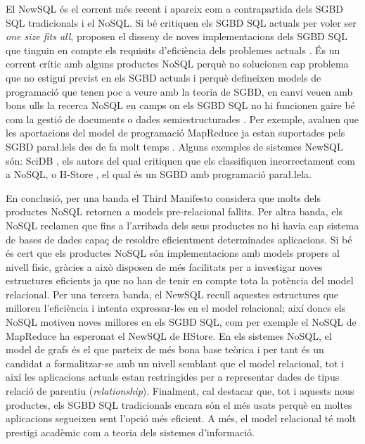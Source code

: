 El NewSQL és el corrent més recent i apareix com a contrapartida dels
\gls{SGBD} \gls{SQL} tradicionals i el NoSQL. Si bé critiquen els \gls{SGBD} \gls{SQL} actuals
per voler ser \emph{one size fits all}, proposen el disseny de noves
implementacions dels \gls{SGBD} \gls{SQL} que tinguin en compte els requisits
d'eficiència dels problemes
actuals \parencite{stonebraker07,stonebraker10}.  És un corrent crític
amb alguns productes NoSQL perquè no solucionen cap problema que no
estigui previst en els \gls{SGBD} actuals i perquè defineixen models de
programació que tenen poc a veure amb la teoria de \gls{SGBD}, en canvi
veuen amb bons ulls la recerca NoSQL en camps on els \gls{SGBD} \gls{SQL} no hi
funcionen gaire bé com la gestió de documents o dades
semiestructurades \parencite{stonebraker11:nocoug}.  Per exemple,
avaluen que les aportacions del model de programació MapReduce ja
estan suportades pels \gls{SGBD} para\l.lels des de fa molt
temps \parencite{pavlo09:sigmod}.  Alguns exemples de sistemes NewSQL
són: SciDB \parencite{stonebraker09:scidb}, els autors del qual
critiquen que els classifiquen incorrectament com a NoSQL, o
H-Store \parencite{hstore}, el qual és un \gls{SGBD} amb programació
para\l.lela.



En conclusió, per una banda el Third Manifesto considera que molts
dels productes NoSQL retornen a models pre-relacional fallits. Per
altra banda, els NoSQL reclamen que fins a l'arribada dels seus
productes no hi havia cap sistema de bases de dades capaç de resoldre
eficientment determinades aplicacions. Si bé és cert que els productes
NoSQL són implementacions amb models propers al nivell físic, gràcies
a això disposen de més facilitats per a investigar noves estructures
eficients ja que no han de tenir en compte tota la potència del model
relacional. Per una tercera banda, el NewSQL recull aquestes
estructures que milloren l'eficiència i intenta expressar-les en el
model relacional; així doncs els NoSQL motiven noves millores en els
\gls{SGBD} \gls{SQL}, com per exemple el NoSQL de MapReduce ha esperonat el NewSQL
de HStore. En els sistemes NoSQL, el model de grafs és el que parteix
de més bona base teòrica i per tant és un candidat a formalitzar-se
amb un nivell semblant que el model relacional, tot i així les
aplicacions actuals estan restringides per a representar dades de
tipus relació de parentiu (\emph{relationship}).  
Finalment, cal destacar que, tot i aquests nous productes, els \gls{SGBD}
\gls{SQL} tradicionals encara són el més usats perquè en moltes aplicacions
segueixen sent l'opció més eficient.  A més, el model relacional té
molt prestigi acadèmic com a teoria dels sistemes d'informació.



